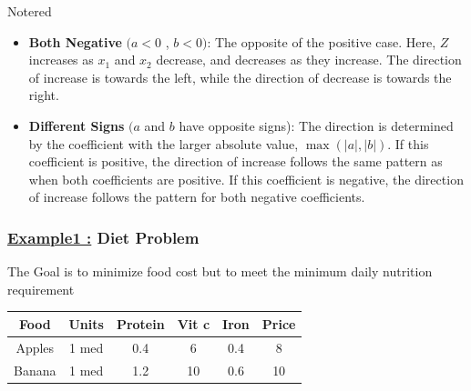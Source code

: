\begin{prettyBox}{Note}{red}
\begin{itemize}
    \item \textbf{Both Negative} \((a < 0\) , \(b < 0)\): The opposite of the positive case. Here, \( Z \) increases
as \( x_1 \) and \( x_2 \) decrease, and decreases as they increase. The direction of increase is towards the left,
while the direction of decrease is towards the right.

    \item \textbf{Different Signs} \((a\) and \(b\) have opposite signs): The direction is determined by 
the coefficient with the larger absolute value, \(\max(|a|, |b|)\). If this coefficient is positive, the direction 
of increase follows the same pattern as when both coefficients are positive. If this coefficient is negative, 
the direction of increase follows the pattern for both negative coefficients.
\end{itemize}
\end{prettyBox}


\newpage
\subsubsection*{{\underline{Example1 :} Diet Problem}}

\vspace{0.25cm}
The Goal is to minimize food cost but to meet the minimum daily nutrition requirement
\vspace{1cm}
\begin{center}
\begin{tabular}{|c|c|c|c|c|c|}
    \hline
    Food & Units & Protein & Vit c & Iron & Price\\
    \hline
    Apples & 1 med & 0.4 & 6 & 0.4 & 8\\
    \hline
    Banana & 1 med & 1.2 & 10 & 0.6 & 10\\
    \hline
\end{tabular}
\end{center}


